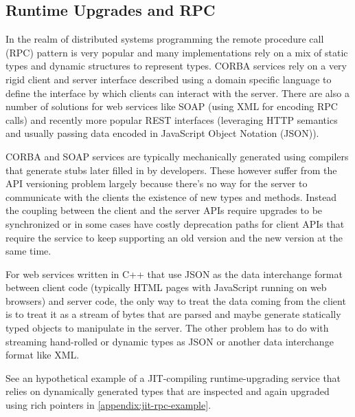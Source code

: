 \subsection{Runtime Upgrades and RPC}

In the realm of distributed systems programming the remote procedure call (RPC)
pattern is very popular and many implementations rely on a mix of static types
and dynamic structures to represent types. CORBA services rely on a very rigid
client and server interface described using a domain specific language to define
the interface by which clients can interact with the server. There are also a
number of solutions for web services like SOAP (using XML for encoding RPC
calls) and recently more popular REST interfaces (leveraging HTTP semantics and
usually passing data encoded in JavaScript Object Notation (JSON)).

CORBA and SOAP services are typically mechanically generated using compilers
that generate stubs later filled in by developers. These however suffer from the
API versioning problem largely because there’s no way for the server to
communicate with the clients the existence of new types and methods. Instead the
coupling between the client and the server APIs require upgrades to be
synchronized or in some cases have costly deprecation paths for client APIs that
require the service to keep supporting an old version and the new version at the
same time.

For web services written in C++ that use JSON as the data interchange format
between client code (typically HTML pages with JavaScript running on web
browsers) and server code, the only way to treat the data coming from the client
is to treat it as a stream of bytes that are parsed and maybe generate
statically typed objects to manipulate in the server. The other problem has to
do with streaming hand-rolled or dynamic types as JSON or another data
interchange format like XML.

See an hypothetical example of a JIT-compiling runtime-upgrading service that
relies on dynamically generated types that are inspected and again upgraded
using rich pointers in \autoref{appendix:jit-rpc-example}.
